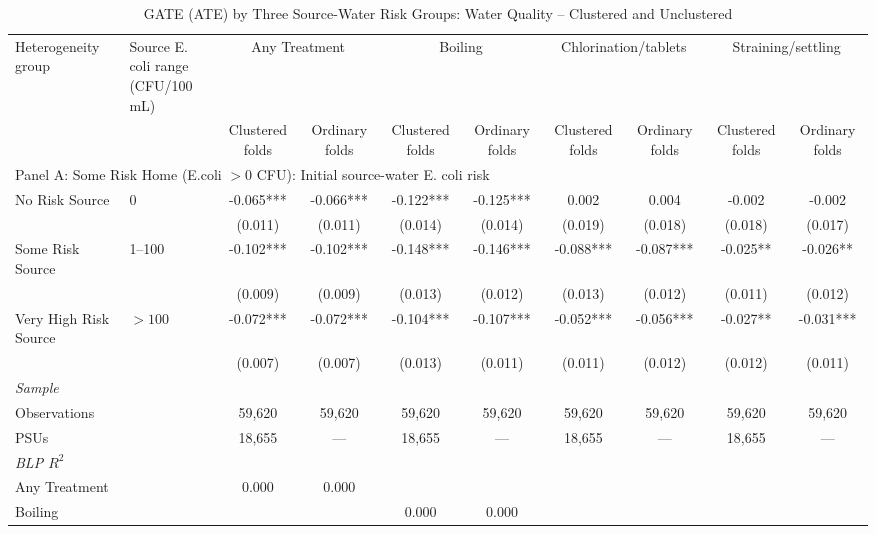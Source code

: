 \begin{landscape}
\begin{table}[p]
\centering
\caption{GATE (ATE) by Three Source-Water Risk Groups: Water Quality -- Clustered and Unclustered}
\label{tab:table_gate_appendix_risk_groups-ecoli}
\scriptsize\setlength{\tabcolsep}{4pt}
\begin{adjustbox}{max width=\linewidth, center}
\begin{tabular}{llcccccccc}
\toprule
Heterogeneity group & \shortstack{Source E. coli range\\(CFU/100 mL)} & \multicolumn{2}{c}{Any Treatment} & \multicolumn{2}{c}{Boiling} & \multicolumn{2}{c}{Chlorination/tablets} & \multicolumn{2}{c}{Straining/settling} \\
 &  & Clustered folds & Ordinary folds & Clustered folds & Ordinary folds & Clustered folds & Ordinary folds & Clustered folds & Ordinary folds \\
\midrule
\multicolumn{10}{l}{Panel A: Some Risk Home (E.coli $>0$ CFU): Initial source-water E. coli risk} \\
No Risk Source & 0 & -0.065*** & -0.066*** & -0.122*** & -0.125*** & 0.002 & 0.004 & -0.002 & -0.002 \\
 &  & (0.011) & (0.011) & (0.014) & (0.014) & (0.019) & (0.018) & (0.018) & (0.017) \\
Some Risk Source & 1--100 & -0.102*** & -0.102*** & -0.148*** & -0.146*** & -0.088*** & -0.087*** & -0.025** & -0.026** \\
 &  & (0.009) & (0.009) & (0.013) & (0.012) & (0.013) & (0.012) & (0.011) & (0.012) \\
Very High Risk Source & $>100$ & -0.072*** & -0.072*** & -0.104*** & -0.107*** & -0.052*** & -0.056*** & -0.027** & -0.031*** \\
 &  & (0.007) & (0.007) & (0.013) & (0.011) & (0.011) & (0.012) & (0.012) & (0.011) \\
\multicolumn{10}{l}{\textit{Sample}} \\
\quad Observations &  & 59,620 & 59,620 & 59,620 & 59,620 & 59,620 & 59,620 & 59,620 & 59,620 \\
\quad PSUs &  & 18,655 & --- & 18,655 & --- & 18,655 & --- & 18,655 & --- \\
\multicolumn{10}{l}{\textit{BLP $R^{2}$}} \\
\quad Any Treatment &  & 0.000 & 0.000 &  &  &  &  &  &  \\
\quad Boiling &  &  &  & 0.000 & 0.000 &  &  &  &  \\

\end{tabular}
\end{adjustbox}
\end{table}
\end{landscape}
